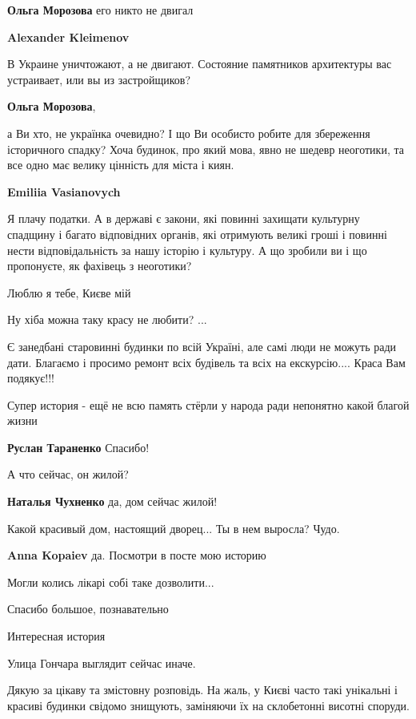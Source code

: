 \begin{itemize}
\begin{itemize}
\begin{itemize}
\textbf{Ольга Морозова} его никто не двигал

\textbf{Alexander Kleimenov} 

В Украине уничтожают, а не двигают. Состояние памятников архитектуры вас
устраивает, или вы из застройщиков?

\end{itemize} %

\textbf{Ольга Морозова}, 

а Ви хто, не українка очевидно? І що Ви особисто робите для збереження
історичного спадку? Хоча будинок, про який мова, явно не шедевр неоготики, та
все одно має велику цінність для міста і киян.

\textbf{Emiliia Vasianovych} 

Я плачу податки. А в державі є закони, які повинні захищати культурну спадщину
і багато відповідних органів, які отримують великі гроші і повинні нести
відповідальність за нашу історію і культуру. А що зробили ви і що пропонуєте,
як фахівець з неоготики?


\end{itemize} %

Люблю я тебе, Києве мій

Ну хіба можна таку красу не любити? ...

Є занедбані старовинні будинки по всій Україні, але самі люди не можуть ради
дати. Благаємо і просимо ремонт всіх будівель та всіх на екскурсію.... Краса Вам
подякує!!!

Супер история - ещё не всю память стёрли у народа ради непонятно какой благой жизни

\textbf{Руслан Тараненко} Спасибо!

А что сейчас, он жилой?

\textbf{Наталья Чухненко} да, дом сейчас жилой!

Какой красивый дом, настоящий дворец... Ты в нем выросла? Чудо.

\textbf{Anna Kopaiev} да.
Посмотри в посте мою историю

Могли колись лікарі собі таке дозволити...

Спасибо большое, познавательно

Интересная история

Улица Гончара выглядит сейчас иначе.


Дякую за цікаву та змістовну розповідь. На жаль, у Києві часто такі унікальні і
красиві будинки свідомо знищують, заміняючи їх на склобетонні висотні споруди.


\end{itemize} %
